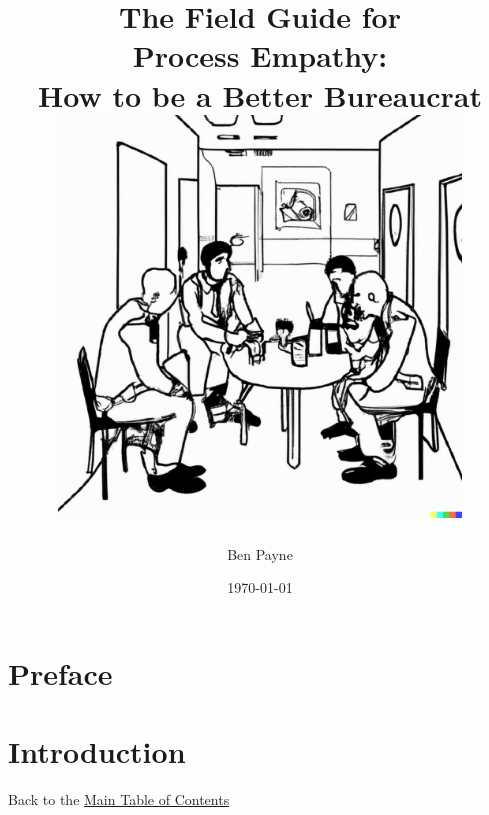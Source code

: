 \documentclass{book}
\title{\huge The Field Guide for\\ Process Empathy:\\
How to be a Better Bureaucrat\\
\vfill
\includegraphics[width=0.8\textwidth]{images/bureaucrat_empathizing_with_coworkers_in_office_breakroom.pdf}
}
\author{\huge Ben Payne}
\date{\today}
\begin{document}





\begin{titlepage}
\maketitle
\thispagestyle{empty}
\end{titlepage}
\clearpage

\frontmatter %

\clearpage

\dominitoc %
\hypertarget{contents}{}
\tableofcontents\label{sec:toc}

\chapter{Preface}
\clearpage

\mainmatter %



\newif\ifpageref
\newif\ifsectionref
\pagereffalse
\sectionreffalse

\newtoggle{pageref}
\newtoggle{sectionref}

\togglefalse{pageref}
\togglefalse{sectionref}



\chapter{Introduction\label{sec:introduction}}
{\footnotesize Back to the \hyperref[sec:toc]{Main Table of Contents}}
\minitoc
  
\end{document}
